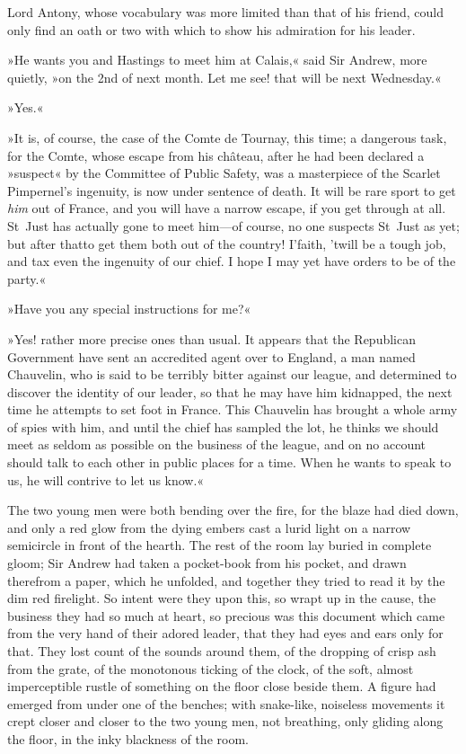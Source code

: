 Lord Antony, whose vocabulary was more limited than that of his friend, could only find an oath or two with which to show his admiration for his leader.

»He wants you and Hastings to meet him at Calais,« said Sir Andrew, more quietly, »on the 2nd of next month. Let me see! that will be next Wednesday.«

»Yes.«

»It is, of course, the case of the Comte de Tournay, this time; a dangerous task, for the Comte, whose escape from his château, after he had been declared a »suspect« by the Committee of Public Safety, was a masterpiece of the Scarlet Pimpernel's ingenuity, is now under sentence of death. It will be rare sport to get \textit{him} out of France, and you will have a narrow escape, if you get through at all. St~Just has actually gone to meet him—of course, no one suspects St~Just as yet; but after that\textellipsis \allowbreak  to get them both out of the country! I'faith, 'twill be a tough job, and tax even the ingenuity of our chief. I hope I may yet have orders to be of the party.«

»Have you any special instructions for me?«

»Yes! rather more precise ones than usual. It appears that the Republican Government have sent an accredited agent over to England, a man named Chauvelin, who is said to be terribly bitter against our league, and determined to discover the identity of our leader, so that he may have him kidnapped, the next time he attempts to set foot in France. This Chauvelin has brought a whole army of spies with him, and until the chief has sampled the lot, he thinks we should meet as seldom as possible on the business of the league, and on no account should talk to each other in public places for a time. When he wants to speak to us, he will contrive to let us know.«

The two young men were both bending over the fire, for the blaze had died down, and only a red glow from the dying embers cast a lurid light on a narrow semicircle in front of the hearth. The rest of the room lay buried in complete gloom; Sir Andrew had taken a pocket-book from his pocket, and drawn therefrom a paper, which he unfolded, and together they tried to read it by the dim red firelight. So intent were they upon this, so wrapt up in the cause, the business they had so much at heart, so precious was this document which came from the very hand of their adored leader, that they had eyes and ears only for that. They lost count of the sounds around them, of the dropping of crisp ash from the grate, of the monotonous ticking of the clock, of the soft, almost imperceptible rustle of something on the floor close beside them. A figure had emerged from under one of the benches; with snake-like, noiseless movements it crept closer and closer to the two young men, not breathing, only gliding along the floor, in the inky blackness of the room.

